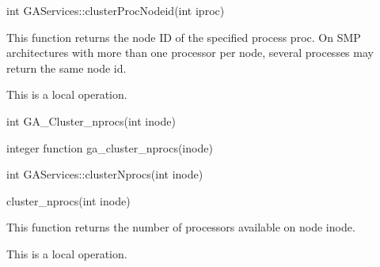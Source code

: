 \documentclass[12pt]{article}
\begin{document}
\begin{cxxapi}
\begin{cxxcode}
int GAServices::clusterProcNodeid(int iproc)
\end{cxxcode}
\begin{funcargs}
\end{funcargs}
\end{cxxapi}
\local

\begin{desc}

This function returns the node ID of the specified process proc.
On SMP architectures with more than one processor per node, several
processes may return the same node id.

This is a  local operation.
\end{desc}


\begin{capi}
\begin{ccode}
int GA_Cluster_nprocs(int inode)
\end{ccode}
\begin{funcargs}
\end{funcargs}
\end{capi}

\begin{fapi}
\begin{fcode}
integer function ga_cluster_nprocs(inode)
\end{fcode}
\begin{funcargs}
\end{funcargs}
\end{fapi}

\begin{cxxapi}
\begin{cxxcode}
int GAServices::clusterNprocs(int inode)
\end{cxxcode}
\begin{funcargs}
\end{funcargs}
\end{cxxapi}

\begin{pyapi}
\begin{pycode}
cluster_nprocs(int inode)
\end{pycode}
\end{pyapi}
\local

\begin{desc}

This function returns the number of processors available on node inode.

This is a local operation.
\end{desc}
\end{document}
